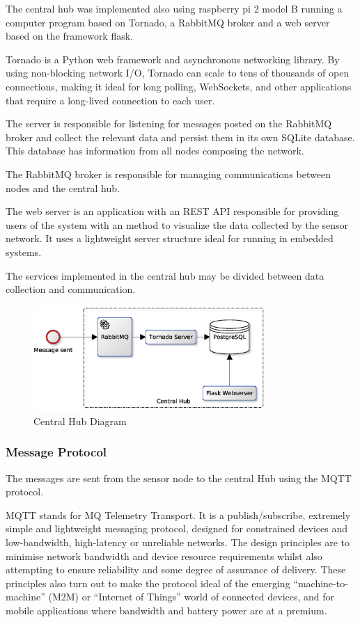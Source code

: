 \documentclass[conference]{IEEEtran}
\begin{document}
The central hub was implemented also using raspberry pi 2 model B running a computer program based on Tornado\cite{Tornado2015}, a RabbitMQ broker and  a web server based on the framework flask\cite{Flask}.

Tornado is a Python web framework and asynchronous networking library. By using non-blocking network I/O, Tornado can scale to tens of thousands of open connections, making it ideal for long polling, WebSockets, and other applications that require a long-lived connection to each user.\cite{Tornado2015}

The server is responsible for listening for messages posted on the RabbitMQ broker and collect the relevant data and persist them in its own SQLite  database. This database has information from all nodes composing the network.

The RabbitMQ broker is responsible for managing communications between nodes and the central hub.

The web server is an application with an REST API\cite{Fielding2000} responsible for providing users of the system with an method to visualize the data collected by the sensor network. It uses a lightweight server structure ideal for running in embedded systems.

The services implemented in the central hub may be divided between data collection and communication.

\begin{figure}[ht!]
\centering
\includegraphics[width=3.5in]{system_diagram}
\caption{Central Hub Diagram}
\label{central_hub_diagram}
\end{figure}


\subsubsection{Message Protocol}
The messages are sent from the sensor node to the central  Hub using the MQTT protocol.

MQTT stands for MQ Telemetry Transport. It is a publish/subscribe, extremely simple and lightweight messaging protocol, designed for constrained devices and low-bandwidth, high-latency or unreliable networks. The design principles are to minimise network bandwidth and device resource requirements whilst also attempting to ensure reliability and some degree of assurance of delivery. These principles also turn out to make the protocol ideal of the emerging “machine-to-machine” (M2M) or “Internet of Things” world of connected devices, and for mobile applications where bandwidth and battery power are at a premium\cite{mqtt}.
\end{document}
